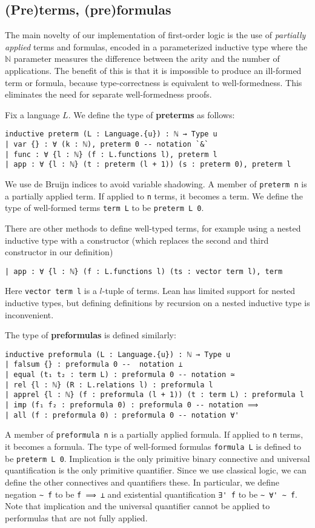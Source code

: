 \documentclass[a4paper,USenglish,cleveref, autoref]{lipics-v2019}
\newcommand{\lil}{\lstinline}
\newcommand{\N}{\mathbb{N}}
\theoremstyle{theorem}
\theoremstyle{definition}
\begin{document}
\subsection{(Pre)terms, (pre)formulas}
The main novelty of our implementation of first-order logic is the use of \emph{partially applied} terms and formulas, encoded in a parameterized inductive type where the $\N$ parameter measures the difference between the arity and the number of applications. The benefit of this is that it is impossible to produce an ill-formed term or formula, because type-correctness is equivalent to well-formedness. This eliminates the need for separate well-formedness proofs.

Fix a language $L$. We define the type of \textbf{preterms} as follows:
\begin{lstlisting}
inductive preterm (L : Language.{u}) : ℕ → Type u
| var {} : ∀ (k : ℕ), preterm 0 -- notation `&`
| func : ∀ {l : ℕ} (f : L.functions l), preterm l
| app : ∀ {l : ℕ} (t : preterm (l + 1)) (s : preterm 0), preterm l
\end{lstlisting}
We use de Bruijn indices to avoid variable shadowing.
A member of \lil{preterm n} is a partially applied term.
If applied to \lil{n} terms, it becomes a term.
We define the type of well-formed terms \lil{term L} to be \lil{preterm L 0}.

There are other methods to define well-typed terms, for example using a nested inductive type with a constructor (which replaces the second and third constructor in our definition)
\begin{lstlisting}
| app : ∀ {l : ℕ} (f : L.functions l) (ts : vector term l), term
\end{lstlisting}
Here \lil{vector term l} is a $l$-tuple of terms.
Lean has limited support for nested inductive types, but defining definitions by recursion on a nested inductive type is inconvenient.

The type of \textbf{preformulas} is defined similarly:
\begin{lstlisting}
inductive preformula (L : Language.{u}) : ℕ → Type u
| falsum {} : preformula 0 --  notation ⊥
| equal (t₁ t₂ : term L) : preformula 0 -- notation ≃
| rel {l : ℕ} (R : L.relations l) : preformula l
| apprel {l : ℕ} (f : preformula (l + 1)) (t : term L) : preformula l
| imp (f₁ f₂ : preformula 0) : preformula 0 -- notation ⟹
| all (f : preformula 0) : preformula 0 -- notation ∀'
\end{lstlisting}

A member of \lil{preformula n} is a partially applied formula.
If applied to \lil{n} terms, it becomes a formula.
The type of well-formed formulas \lil{formula L} is defined to be \lil{preterm L 0}.
Implication is the only primitive binary connective and universal quantification is the only primitive quantifier. Since we use classical logic, we can define the other connectives and quantifiers these.
In particular, we define negation \lil{∼ f} to be \lil{f ⟹ ⊥} and existential quantification \lil{∃' f} to be \lil{∼ ∀' ∼ f}.
Note that implication and the universal quantifier cannot be applied to performulas that are not fully applied.
\end{document}
